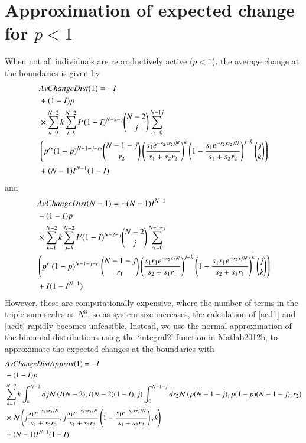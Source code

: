 \section{Approximation of expected change for $p<1$}
\label{app2e}
When not all individuals are reproductively active ($p<1$), the average change at the boundaries is given by
\begin{align}
\label{acd1}
&AvChangeDist(1)=-I \\ 
&+ (1-I)p \notag \\
& \times \sum_{k=0}^{N-2} k \sum_{j=k}^{N-2} I^j(1-I)^{N-2-j}{N-2\choose j} \sum_{r_2=0}^{N-1j}\\&\left( p^{r_2}(1-p)^{N-1-j-r_2} {N-1-j\choose r_2}\left( \frac{s_1 e^{-s_2xr_2/N}}{s_1+s_2r_2}\right)^k \left(1- \frac{s_1 e^{-s_2xr_2/N}}{s_1+s_2r_2}\right)^{j-k}{j\choose k} \right) \notag \\
&+(N-1)I^{N-1}(1-I) \notag
\end{align}
and
\begin{align}
\label{acdt}
&AvChangeDist(N-1)=-(N-1)I^{N-1}\\& - (1-I)p \notag \\
&\times \sum_{k=1}^{N-2}k\sum_{j=k}^{N-2} I^j(1-I)^{N-2-j} {N-2 \choose j} \sum_{r_1=0}^{N-1-j} \notag \\
&\left( p^{r_1}(1-p)^{N-1-j-r_1} {N-1-j\choose r_1}\left( \frac{s_1r_1 e^{-s_2x/N}}{s_2+s_1r_1}\right)^{j-k} \left(1- \frac{s_1r_1 e^{-s_2x/N}}{s_2+s_1r_1}\right)^k{j\choose k} \right) \notag \\
&+I(1-I^{N-1}) \notag
\end{align}
However, these are computationally expensive, where the number of terms in the triple sum scales as $N^3$, so as system size increases, the calculation of \eqref{acd1} and \eqref{acdt} rapidly becomes unfeasible. Instead, we use the normal approximation of the binomial distributions using the `integral2' function in Matlab2012b, to approximate the expected changes at the boundaries with 
\begin{align}
& AvChangeDistApprox(1)=-I \\
&+(1-I)p \notag \\
&\sum_{k=1}^{N-2} k \int_k^{N-2}dj \mathcal{N}\left(I(N-2),I(N-2)(1-I),j\right) \int_0^{N-1-j}dr_2 \mathcal{N}\left(p(N-1-j),p(1-p)(N-1-j),r_2\right) \notag \\
&\times \mathcal{N}\left(j\frac{s_1 e^{-s_2xr_2/N}}{s_1+s_2r_2},j\frac{s_1 e^{-s_2xr_2/N}}{s_1+s_2r_2}\left(1-\frac{s_1 e^{-s_2xr_2/N}}{s_1+s_2r_2}\right),k \right)\notag \\
 &+(N-1)I^{N-1}(1-I)\notag
\end{align}
